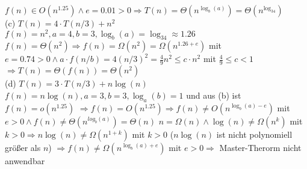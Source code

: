 \documentclass{article}
\begin{document}
\begin{flushleft}
\newline
$f(n) \in O(n^{1.25}) \land e = 0.01 > 0 \Longrightarrow T(n) = \Theta(n^{\log_b(a)}) = \Theta(n^{\log_34})$
\newline\\
(c) $T(n) = 4 \cdot T(n/3) + n^2$
\newline
$f(n) = n^2, a = 4, b = 3, \log_b(a) = \log_34 \approx 1.26$
\newline 
$f(n) = \Theta(n^2) \Longrightarrow f(n) = \Omega(n^2) = \Omega(n^{1.26 + e})$ mit $e = 0.74 > 0 \land 
a \cdot f(n/b) = 4(n/3)^2 = \displaystyle\frac{4}{9}n^2 \leq c \cdot n^2 $ mit $ \displaystyle\frac{4}{9} \leq c < 1$
$\Longrightarrow T(n) = \Theta(f(n)) = \Theta(n^2)$
\newline\\
(d) $T(n) = 3 \cdot T(n/3) + n\log(n)$
\newline
$f(n) = n\log(n), a = 3, b = 3, \log_a(b) = 1$ und aus (b) ist $f(n) = o(n^{1.25})$
\newline
$\Longrightarrow f(n) = O(n^{1.25}) \Longrightarrow f(n) \not = O(n^{\log_b(a) - e})$ mit $ e > 0 \land f(n) \not = \Theta(n^{log_b(a)}) = \Theta(n)$
\newline
$n = \Omega(n) \land \log(n) \not = \Omega(n^k)$ mit $k > 0 \Longrightarrow n\log(n) \not = \Omega(n^{1+k})$ mit $k > 0$ 
($n\log(n)$ ist nicht polynomiell größer als $n$)
$\Longrightarrow f(n) \not = \Omega(n^{\log_b(a) + e})$ mit $e > 0 \Longrightarrow$ Master-Therorm nicht anwendbar
\end{flushleft}
\end{document}
